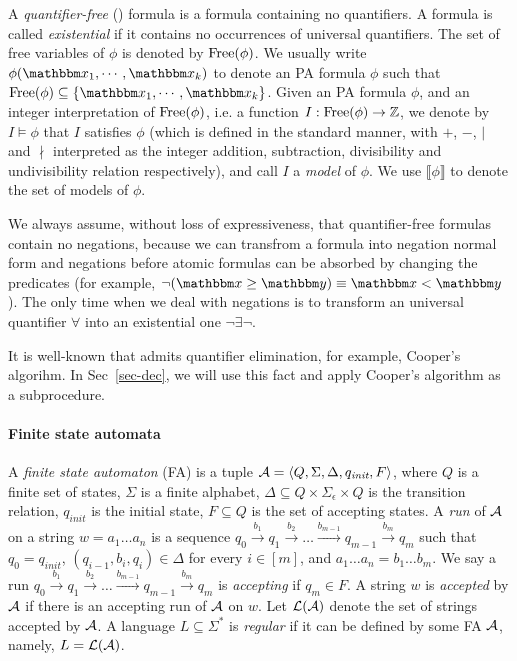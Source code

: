 A \emph{quantifier-free} {\pa} (\qfpa) formula is a {\pa} formula containing no quantifiers. A {\pa} formula is called \emph{existential} if it contains no occurrences of universal quantifiers.
The set of free variables of $\phi$ is denoted by $\mathrm{Free}(\phi)$. 
We usually write $\phi(\ivarx_1,\cdots, \ivarx_k)$ to denote an PA formula $\phi$ such that $\free(\phi) \subseteq \{\ivarx_1,\cdots, \ivarx_k\}$. Given an PA formula $\phi$, and an integer interpretation of $\mathrm{Free}(\phi)$, i.e. a function $I: \mathrm{Free}(\phi) \rightarrow \mathbb{Z}$, we denote by $I \models \phi$ that $I$ satisfies $\phi$ (which is defined in the standard manner, with $+$, $-$, $\vert$ and $\nmid$ interpreted as the integer addition, subtraction, divisibility and undivisibility relation respectively), and call $I$ a \emph{model} of $\phi$. We use $\llbracket \phi \rrbracket$ to denote the set of models of $\phi$. 

We always assume, without loss of expressiveness, that quantifier-free formulas contain no negations, because we can transfrom a formula into negation normal form and negations before atomic formulas can be absorbed by changing the predicates (for example, $\neg (\ivarx \ge \ivary)\equiv \ivarx < \ivary$). The only time when we deal with negations is to transform an universal quantifier $\forall$ into an existential one $\neg \exists \neg$. 

It is well-known that {\pa} admits quantifier elimination, for example, Cooper's algorihm\cite{Cooper72}. In Sec~\ref{sec-dec}, we will use this fact and apply Cooper's algorithm as a subprocedure.

\paragraph{Finite state automata}
A \emph{finite state automaton} (FA) is a tuple 
$\mathcal{A}=\langle Q,\Sigma,\Delta, q_{\textit{init}}, F\rangle$, 
where $Q$ is a finite set of states, 
$\Sigma$ is a finite alphabet,
$\Delta\subseteq Q\times \Sigma_\epsilon\times Q$ is the transition relation, 
$q_{\textit{init}}$ is the initial state, $F \subseteq Q$ is the set of accepting states. 
A \emph{run} of $\mathcal{A}$ on a string $w = a_1 \ldots a_n$ is a sequence $q_0 \xrightarrow{b_1} q_1  \xrightarrow{b_2}  \ldots   \xrightarrow{b_{m-1}}  q_{m-1} \xrightarrow{b_m} q_m$ such that $q_0 = q_{\textit{init}}$, $(q_{i-1}, b_i, q_i) \in \Delta$ for every $i \in [m]$, and $a_1 \ldots a_n = b_1 \ldots b_m$. We say a run $q_0 \xrightarrow{b_1} q_1  \xrightarrow{b_2}  \ldots   \xrightarrow{b_{m-1}}  q_{m-1} \xrightarrow{b_m} q_m$ is \emph{accepting} if $q_m  \in F$. A string $w$ is \emph{accepted} by $\mathcal{A}$ if there is an accepting run of $\mathcal{A}$ on $w$. Let $\mathcal{L}(\mathcal{A})$ denote the set of strings accepted by $\mathcal{A}$. A language $L \subseteq \Sigma^*$ is \emph{regular} if it can be defined by some FA $\mathcal{A}$, namely, $L = \mathcal{L}(\mathcal{A})$.


